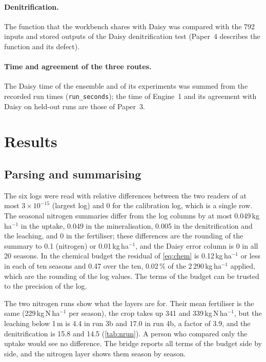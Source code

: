 \paragraph{Denitrification.} The function that the workbench shares with Daisy was compared with the 792 inputs and stored outputs of the Daisy denitrification test (Paper~4 describes the function and its defect).

\paragraph{Time and agreement of the three routes.} The Daisy time of the ensemble and of its experiments was summed from the recorded run times (\texttt{run\_seconds}); the time of Engine~1 and its agreement with Daisy on held-out runs are those of Paper~3.

\section{Results}
\subsection{Parsing and summarising}
The six logs were read with relative differences between the two readers of at most $3\times10^{-15}$ (largest log) and 0 for the calibration log, which is a single row. The seasonal nitrogen summaries differ from the log columns by at most 0.049\,kg\,ha$^{-1}$ in the uptake, 0.049 in the mineralisation, 0.005 in the denitrification and the leaching, and 0 in the fertiliser; these differences are the rounding of the summary to 0.1 (nitrogen) or 0.01\,kg\,ha$^{-1}$, and the Daisy error column is 0 in all 20 seasons. In the chemical budget the residual of \cref{eq:chem} is 0.12\,kg\,ha$^{-1}$ or less in each of ten seasons and 0.47 over the ten, 0.02\,\% of the 2\,290\,kg\,ha$^{-1}$ applied, which are the rounding of the log values. The terms of the budget can be trusted to the precision of the log.

The two nitrogen runs show what the layers are for. Their mean fertiliser is the same (229\,kg\,N\,ha$^{-1}$ per season), the crop takes up 341 and 339\,kg\,N\,ha$^{-1}$, but the leaching below 1\,m is 4.4 in run 3b and 17.0 in run 4b, a factor of 3.9, and the denitrification is 15.8 and 14.5 (\cref{tab:nrun}). A person who compared only the uptake would see no difference. The bridge reports all terms of the budget side by side, and the nitrogen layer shows them season by season.

